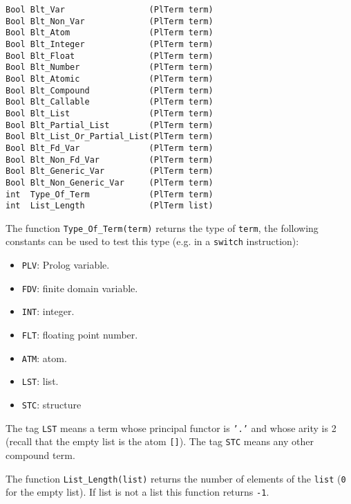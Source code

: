 \begin{Indentation}
\begin{verbatim}
Bool Blt_Var                 (PlTerm term)
Bool Blt_Non_Var             (PlTerm term)
Bool Blt_Atom                (PlTerm term)
Bool Blt_Integer             (PlTerm term)
Bool Blt_Float               (PlTerm term)
Bool Blt_Number              (PlTerm term)
Bool Blt_Atomic              (PlTerm term)
Bool Blt_Compound            (PlTerm term)
Bool Blt_Callable            (PlTerm term)
Bool Blt_List                (PlTerm term)
Bool Blt_Partial_List        (PlTerm term)
Bool Blt_List_Or_Partial_List(PlTerm term)
Bool Blt_Fd_Var              (PlTerm term)
Bool Blt_Non_Fd_Var          (PlTerm term)
Bool Blt_Generic_Var         (PlTerm term)
Bool Blt_Non_Generic_Var     (PlTerm term)
int  Type_Of_Term            (PlTerm term)
int  List_Length             (PlTerm list)
\end{verbatim}
\end{Indentation}

The function \texttt{Type\_Of\_Term(term)} returns the type of
\texttt{term}, the following constants can be used to test this type (e.g.
in a \texttt{switch} instruction):

\begin{itemize}
\item \texttt{PLV}: Prolog variable.

\item \texttt{FDV}: finite domain variable.

\item \texttt{INT}: integer.

\item \texttt{FLT}: floating point number.

\item \texttt{ATM}: atom.

\item \texttt{LST}: list.

\item \texttt{STC}: structure
\end{itemize}

The tag \texttt{LST} means a term whose principal functor is \texttt{'.'}
and whose arity is 2 (recall that the empty list is the atom \texttt{[]}).
The tag \texttt{STC} means any other compound term.

The function \texttt{List\_Length(list)} returns the number of elements of
the \texttt{list} (\texttt{0} for the empty list). If list is not a list
this function returns \texttt{-1}.

